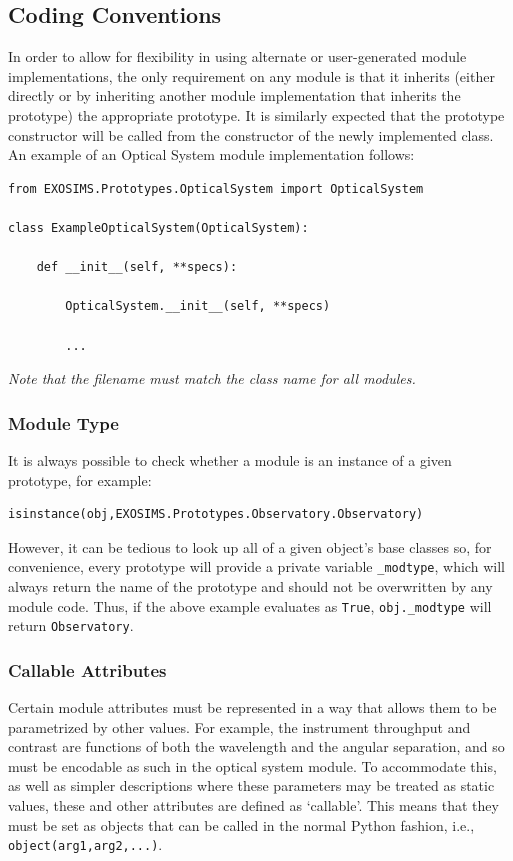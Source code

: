 \documentclass[cleanfoot]{asme2ej}
\begin{document}
\subsection{Coding Conventions}
In order to allow for flexibility in using alternate or user-generated module implementations, the only requirement on any module is that it inherits (either directly or by inheriting another module implementation that inherits the prototype) the appropriate prototype.  It is similarly expected that the prototype constructor will be called from the constructor of the newly implemented class.  An example of an Optical System module implementation follows:

\begin{verbatim}
from EXOSIMS.Prototypes.OpticalSystem import OpticalSystem

class ExampleOpticalSystem(OpticalSystem):
    
    def __init__(self, **specs):
                
        OpticalSystem.__init__(self, **specs)
        
        ...

\end{verbatim}

\emph{Note that the filename must match the class name for all modules.}

\subsubsection{Module Type}
It is always possible to check whether a module is an instance of a given prototype, for example:
\begin{verbatim}
isinstance(obj,EXOSIMS.Prototypes.Observatory.Observatory)
\end{verbatim}
However, it can be tedious to look up all of a given object's base classes so, for convenience, every prototype will provide a private variable \verb+_modtype+, which will always return the name of the prototype and should not be overwritten by any module code.  Thus, if the above example evaluates as \verb+True+, \verb+obj._modtype+ will return \verb+Observatory+.

\subsubsection{Callable Attributes}
Certain module attributes must be represented in a way that allows them to be parametrized by other values.  For example, the instrument throughput and contrast are functions of both the wavelength and the angular separation, and so must be encodable as such in the optical system module.  To accommodate this, as well as simpler descriptions where these parameters may be treated as static values, these and other attributes are defined as `callable'.  This means that they must be set as objects that can be called in the normal Python fashion, i.e., \verb+object(arg1,arg2,...)+.  
\end{document}
